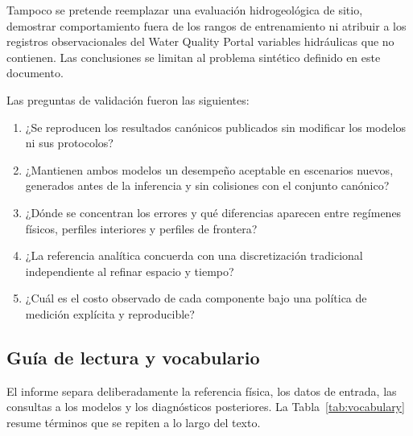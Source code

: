 \documentclass[11pt,a4paper]{article}
\begin{document}
Tampoco se pretende reemplazar una evaluación hidrogeológica de sitio,
demostrar comportamiento fuera de los rangos de entrenamiento ni atribuir a
los registros observacionales del Water Quality Portal variables hidráulicas
que no contienen. Las conclusiones se limitan al problema sintético definido
en este documento.

Las preguntas de validación fueron las siguientes:

\begin{enumerate}
    \item ¿Se reproducen los resultados canónicos publicados sin modificar los
    modelos ni sus protocolos?
    \item ¿Mantienen ambos modelos un desempeño aceptable en escenarios nuevos,
    generados antes de la inferencia y sin colisiones con el conjunto canónico?
    \item ¿Dónde se concentran los errores y qué diferencias aparecen entre
    regímenes físicos, perfiles interiores y perfiles de frontera?
    \item ¿La referencia analítica concuerda con una discretización tradicional
    independiente al refinar espacio y tiempo?
    \item ¿Cuál es el costo observado de cada componente bajo una política de
    medición explícita y reproducible?
\end{enumerate}

\subsection{Guía de lectura y vocabulario}

El informe separa deliberadamente la referencia física, los datos de entrada,
las consultas a los modelos y los diagnósticos posteriores. La
Tabla~\ref{tab:vocabulary} resume términos que se repiten a lo largo del texto.
\end{document}
